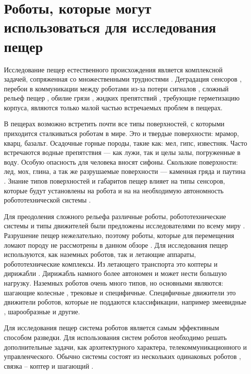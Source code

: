 \section{Роботы, которые могут использоваться для исследования пещер}

Исследование пещер естественного происхождения является комплексной задачей, сопряженная со множественными трудностями \cite{Zhang2017a, Frumkin2019}. Деградация сенсоров \cite{Huang2019}, перебои в коммуникации между роботами из-за потери сигналов \cite{Vaquero2018, Thangavelautham2017}, сложный рельеф пещер \cite{Thangavelautham2017}, обилие грязи \cite{Baker2004}, жидких препятствий \cite{Morris2006}, требующие герметизацию корпуса, являются только малой частью встречаемых проблем в пещерах. 

В пещерах возможно встретить почти все типы поверхностей, с которыми приходится сталкиваться роботам в мире. Это и твердые поверхности: мрамор, кварц, базальт. Осадочные горные породы, такие как: мел, гипс, известняк. Часто встречаются водные препятствия — как лужи, так и целы залы, погруженные в воду. Особую опасность для человека вносят сифоны. Скользкие поверхности: лед, мох, глина, а так же разрушаемые поверхности — каменная гряда и паутина \cite{1960,1963,1969,1971}. Знание типов поверхностей и габаритов пещер влияет на типы сенсоров, которые будут установлены на робота и на на необходимую автономность робототехнической системы \cite{Mascarich2018a}. 

Для преодоления сложного рельефа различные роботы, робототехнические системы и типы движителей были предложены исследователями по всему миру \cite{Morris2006a}. Разрушение пещер нежелательно, поэтому роботы, которые для перемещения ломают породу не рассмотрены в данном обзоре \cite{Semini2016}. Для исследования пещер используются, как наземных роботов, так и летающие аппараты, робототехнические комплексы. Из летающего транспорта это коптеры \cite{Papachristos2019,Scaramuzza2014,zinggMAVNavigationIndoor2010} и дирижабли \cite{Huang2019}. Дирижабль намного более автономен и может нести большую нагрузку. Наземных роботов очень много типов, но основными являются: шагающие \cite{Tan2016,Lynch2019} колесные \cite{Molyneaux2016,Vaquero2018}, трековые \cite{Reddy2015} и специфичные. Специфичные движители это движители роботов, которые не поддаются классификации, например змеевидные \cite{Ye2007,Borenstein2007}, шарообразные \cite{Thangavelautham2017,Dubowsky2008,Dang2019} и другие.

Для исследования пещер система роботов является самым эффективным способом разведки. Для использования систем роботов необходимо решать дополнительные задачи, как архитектурного характера, телекоммуникационного и управленческого. Обычно системы состоят из нескольких одинаковых роботов \cite{Vaquero2018}, связка – коптер и шагающий \cite{Chen2010,Cantelli2013}.

